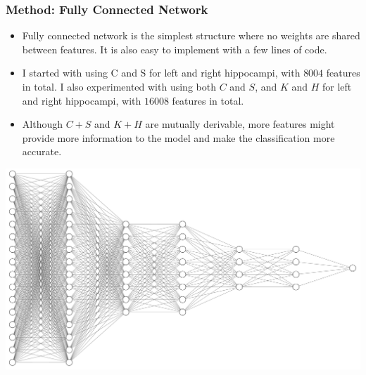 \documentclass{beamer}
\begin{document}
\begin{frame}
\frametitle{Method: Fully Connected Network}
\scriptsize{
\begin{itemize}
    \item Fully connected network is the simplest structure where no weights are shared between features. It is also easy to implement with a few lines of code. \\
    \item I started with using C and S for left and right hippocampi, with $8004$ features in total. I also experimented with using both $C$ and $S$, and $K$ and $H$ for left and right hippocampi, with $16008$ features in total. \\
    \item Although $C+S$ and $K+H$ are mutually derivable, more features might provide more information to the model and make the classification more accurate.
\end{itemize}
}
\begin{center}
\includegraphics[width=0.7\linewidth]{FCN.png}
\end{center}
\end{frame}
\end{document}
